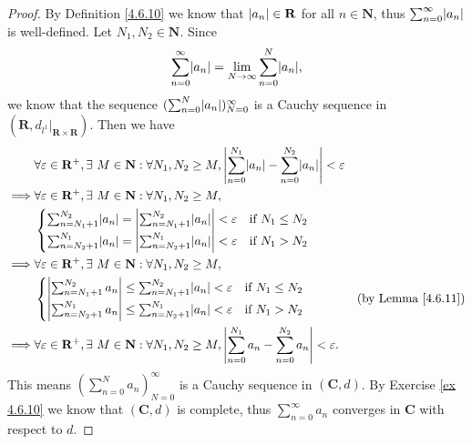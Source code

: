 \begin{proof}
    By Definition \ref{4.6.10} we know that \(\abs*{a_n} \in \mathbf{R}\) for all \(n \in \mathbf{N}\), thus \(\sum_{n = 0}^\infty \abs*{a_n}\) is well-defined.
    Let \(N_1, N_2 \in \mathbf{N}\).
    Since
    \[
        \sum_{n = 0}^\infty \abs*{a_n} = \lim_{N \to \infty} \sum_{n = 0}^N \abs*{a_n},
    \]
    we know that the sequence \((\sum_{n = 0}^N \abs*{a_n})_{N = 0}^\infty\) is a Cauchy sequence in \((\mathbf{R}, d_{l^1}|_{\mathbf{R} \times \mathbf{R}})\).
    Then we have
    \begin{align*}
                 & \forall \varepsilon \in \mathbf{R}^+, \exists\ M \in \mathbf{N} : \forall N_1, N_2 \geq M, \abs*{\sum_{n = 0}^{N_1} \abs*{a_n} - \sum_{n = 0}^{N_2} \abs*{a_n}} < \varepsilon \\
        \implies & \forall \varepsilon \in \mathbf{R}^+, \exists\ M \in \mathbf{N} : \forall N_1, N_2 \geq M,                                                                                    \\
                 & \begin{cases}
                       \sum_{n = N_1 + 1}^{N_2} \abs*{a_n} = \abs*{\sum_{n = N_1 + 1}^{N_2} \abs*{a_n}} < \varepsilon & \text{if } N_1 \leq N_2 \\
                       \sum_{n = N_2 + 1}^{N_1} \abs*{a_n} = \abs*{\sum_{n = N_2 + 1}^{N_1} \abs*{a_n}} < \varepsilon & \text{if } N_1 > N_2
                   \end{cases}                                        \\
        \implies & \forall \varepsilon \in \mathbf{R}^+, \exists\ M \in \mathbf{N} : \forall N_1, N_2 \geq M,                                                                                    \\
                 & \begin{cases}
                       \abs*{\sum_{n = N_1 + 1}^{N_2} a_n} \leq \sum_{n = N_1 + 1}^{N_2} \abs*{a_n} < \varepsilon & \text{if } N_1 \leq N_2 \\
                       \abs*{\sum_{n = N_2 + 1}^{N_1} a_n} \leq \sum_{n = N_2 + 1}^{N_1} \abs*{a_n} < \varepsilon & \text{if } N_1 > N_2
                   \end{cases}                                                       & \text{(by Lemma \ref{4.6.11})}                                                          \\
        \implies & \forall \varepsilon \in \mathbf{R}^+, \exists\ M \in \mathbf{N} : \forall N_1, N_2 \geq M, \abs*{\sum_{n = 0}^{N_1} a_n - \sum_{n = 0}^{N_2} a_n} < \varepsilon.
    \end{align*}
    This means \((\sum_{n = 0}^N a_n)_{N = 0}^\infty\) is a Cauchy sequence in \((\mathbf{C}, d)\).
    By Exercise \ref{ex 4.6.10} we know that \((\mathbf{C}, d)\) is complete, thus \(\sum_{n = 0}^\infty a_n\) converges in \(\mathbf{C}\) with respect to \(d\).
\end{proof}


